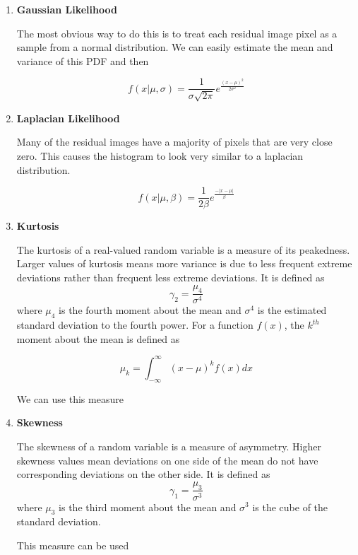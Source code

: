 \begin{enumerate}
\item{\textbf{Gaussian Likelihood}}

The most obvious way to do this is to treat each residual image pixel as a sample from a normal distribution.  We can easily estimate the mean and variance of this PDF and then 

$$f(x|\mu,\sigma)=\frac{1}{\sigma\sqrt{2\pi}}e^{\frac{(x-\mu)^2}{2\sigma^2}}$$


\item{\textbf{Laplacian Likelihood}}

Many of the residual images have a majority of pixels that are very close zero.  This causes the histogram to look very similar to a laplacian distribution.

$$f(x|\mu,\beta)=\frac{1}{2\beta}e^{\frac{-|x-\mu|}{\beta}}$$

\item{\textbf{Kurtosis}}

The kurtosis of a real-valued random variable is a measure of its peakedness.  Larger values of kurtosis means more variance is due to less frequent extreme deviations rather than frequent less extreme deviations.  It is defined as $$\gamma_2=\frac{\mu_4}{\sigma^4}$$ where $\mu_4$ is the fourth moment about the mean and $\sigma^4$ is the estimated standard deviation to the fourth power.  For a function $f(x)$, the $k^{th}$ moment about the mean is defined as 

$$\mu_k = \int_{-\infty}^{\infty}{(x-\mu)^kf(x)dx}$$

We can use this measure 

\item{\textbf{Skewness}}

The skewness of a random variable is a measure of asymmetry.  Higher skewness values mean deviations on one side of the mean do not have corresponding deviations on the other side.  It is defined as $$\gamma_1=\frac{\mu_3}{\sigma^3}$$ where $\mu_3$ is the third moment about the mean and $\sigma^3$ is the cube of the standard deviation.

This measure can be used


\end{enumerate}


